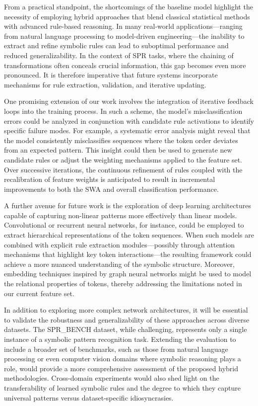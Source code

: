 \documentclass{article}
\begin{document}
From a practical standpoint, the shortcomings of the baseline model highlight the necessity of employing hybrid approaches that blend classical statistical methods with advanced rule-based reasoning. In many real-world applications—ranging from natural language processing to model-driven engineering—the inability to extract and refine symbolic rules can lead to suboptimal performance and reduced generalizability. In the context of SPR tasks, where the chaining of transformations often conceals crucial information, this gap becomes even more pronounced. It is therefore imperative that future systems incorporate mechanisms for rule extraction, validation, and iterative updating. 

One promising extension of our work involves the integration of iterative feedback loops into the training process. In such a scheme, the model’s misclassification errors could be analyzed in conjunction with candidate rule activations to identify specific failure modes. For example, a systematic error analysis might reveal that the model consistently misclassifies sequences where the token order deviates from an expected pattern. This insight could then be used to generate new candidate rules or adjust the weighting mechanisms applied to the feature set. Over successive iterations, the continuous refinement of rules coupled with the recalibration of feature weights is anticipated to result in incremental improvements to both the SWA and overall classification performance.

A further avenue for future work is the exploration of deep learning architectures capable of capturing non-linear patterns more effectively than linear models. Convolutional or recurrent neural networks, for instance, could be employed to extract hierarchical representations of the token sequences. When such models are combined with explicit rule extraction modules—possibly through attention mechanisms that highlight key token interactions—the resulting framework could achieve a more nuanced understanding of the symbolic structure. Moreover, embedding techniques inspired by graph neural networks might be used to model the relational properties of tokens, thereby addressing the limitations noted in our current feature set.

In addition to exploring more complex network architectures, it will be essential to validate the robustness and generalizability of these approaches across diverse datasets. The SPR\_BENCH dataset, while challenging, represents only a single instance of a symbolic pattern recognition task. Extending the evaluation to include a broader set of benchmarks, such as those from natural language processing or even computer vision domains where symbolic reasoning plays a role, would provide a more comprehensive assessment of the proposed hybrid methodologies. Cross-domain experiments would also shed light on the transferability of learned symbolic rules and the degree to which they capture universal patterns versus dataset-specific idiosyncrasies.
\end{document}
